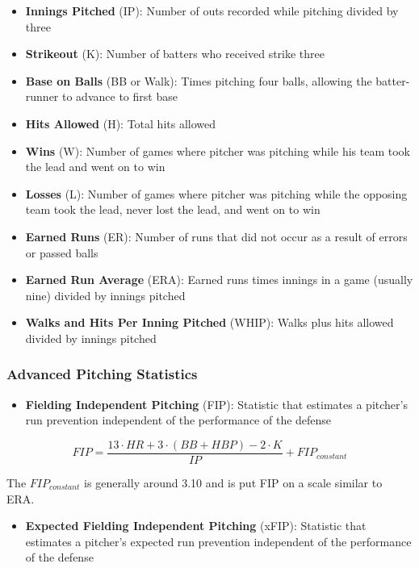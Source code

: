\documentclass[
  11pt,
]{book}
\providecommand{\tightlist}{%
  \setlength{\itemsep}{0pt}\setlength{\parskip}{0pt}}
\theoremstyle{definition}
\theoremstyle{definition}
\theoremstyle{definition}
\theoremstyle{definition}
\theoremstyle{remark}
\begin{document}
\begin{itemize}
\item
  \textbf{Innings Pitched} (IP): Number of outs recorded while pitching divided by three
\item
  \textbf{Strikeout} (K): Number of batters who received strike three
\item
  \textbf{Base on Balls} (BB or Walk): Times pitching four balls, allowing the batter-runner to advance to first base
\item
  \textbf{Hits Allowed} (H): Total hits allowed
\item
  \textbf{Wins} (W): Number of games where pitcher was pitching while his team took the lead and went on to win
\item
  \textbf{Losses} (L): Number of games where pitcher was pitching while the opposing team took the lead, never lost the lead, and went on to win
\item
  \textbf{Earned Runs} (ER): Number of runs that did not occur as a result of errors or passed balls
\item
  \textbf{Earned Run Average} (ERA): Earned runs times innings in a game (usually nine) divided by innings pitched
\item
  \textbf{Walks and Hits Per Inning Pitched} (WHIP): Walks plus hits allowed divided by innings pitched
\end{itemize}

\hypertarget{advanced-pitching-statistics}{%
\subsubsection{Advanced Pitching Statistics}\label{advanced-pitching-statistics}}

\begin{itemize}
\tightlist
\item
  \textbf{Fielding Independent Pitching} (FIP): Statistic that estimates a pitcher's run prevention independent of the performance of the defense
\end{itemize}

\[FIP = \frac{13 \cdot HR + 3 \cdot (BB + HBP) - 2 \cdot K}{IP} + FIP_{constant}\]

The \(FIP_{constant}\) is generally around 3.10 and is put FIP on a scale similar to ERA.

\begin{itemize}
\tightlist
\item
  \textbf{Expected Fielding Independent Pitching} (xFIP): Statistic that estimates a pitcher's expected run prevention independent of the performance of the defense
\end{itemize}
\end{document}
